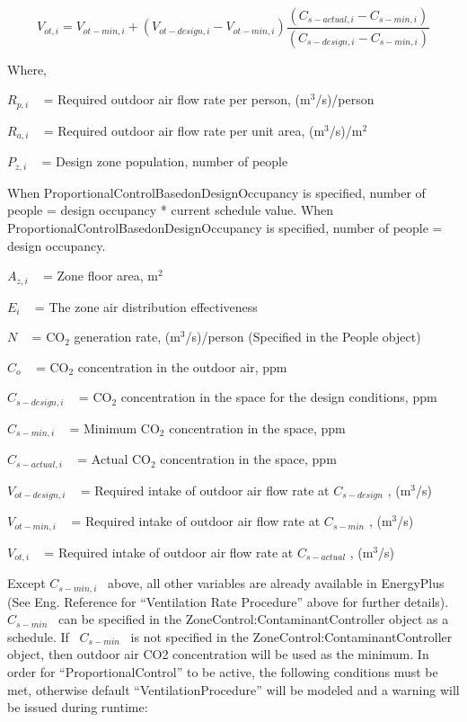 \begin{equation}
{V_{ot,i}} = {V_{ot - min,i}} + ({V_{ot - design,i}} - {V_{ot - min,i}})\frac{{({C_{s - actual,i}} - {C_{s - min,i}})}}{{({C_{s - design,i}} - {C_{s - min,i}})}}
\end{equation}

Where,

\({R_{p,i}}\) ~ = Required outdoor air flow rate per person, (m\(^{3}\)/s)/person

\({R_{a,i}}\) ~ = Required outdoor air flow rate per unit area, (m\(^{3}\)/s)/m\(^{2}\)

\({P_{z,i}}\) ~ = Design zone population, number of people

When ProportionalControlBasedonDesignOccupancy is specified, number of people = design occupancy * current schedule value. When ProportionalControlBasedonDesignOccupancy is specified, number of people = design occupancy.

\({A_{z,i}}\) ~ = Zone floor area, m\(^{2}\)

\({E_i}\) ~ = The zone air distribution effectiveness

\(N\) ~ = CO\(_{2}\) generation rate, (m\(^{3}\)/s)/person (Specified in the People object)

\({C_o}\) ~ = CO\(_{2}\) concentration in the outdoor air, ppm

\({C_{s - design,i}}\) ~ = CO\(_{2}\) concentration in the space for the design conditions, ppm

\({C_{s - min,i}}\) ~ = Minimum CO\(_{2}\) concentration in the space, ppm

\({C_{s - actual,i}}\) ~ = Actual CO\(_{2}\) concentration in the space, ppm

\({V_{ot - design,i}}\) ~ = Required intake of outdoor air flow rate at \({C_{s - design}}\) , (m\(^{3}\)/s)

\({V_{ot - min,i}}\) ~ = Required intake of outdoor air flow rate at \({C_{s - min}}\) , (m\(^{3}\)/s)

\({V_{ot,i}}\) ~ = Required intake of outdoor air flow rate at \({C_{s - actual}}\) , (m\(^{3}\)/s)

Except \({C_{s - min,i}}\) ~above, all other variables are already available in EnergyPlus (See Eng. Reference for ``Ventilation Rate Procedure'' above for further details). \({C_{s - min}}\) ~can be specified in the ZoneControl:ContaminantController object as a schedule. If~ \({C_{s - min}}\) ~is not specified in the ZoneControl:ContaminantController object, then outdoor air CO2 concentration will be used as the minimum. In order for ``ProportionalControl'' to be active, the following conditions must be met, otherwise default ``VentilationProcedure'' will be modeled and a warning will be issued during runtime:

